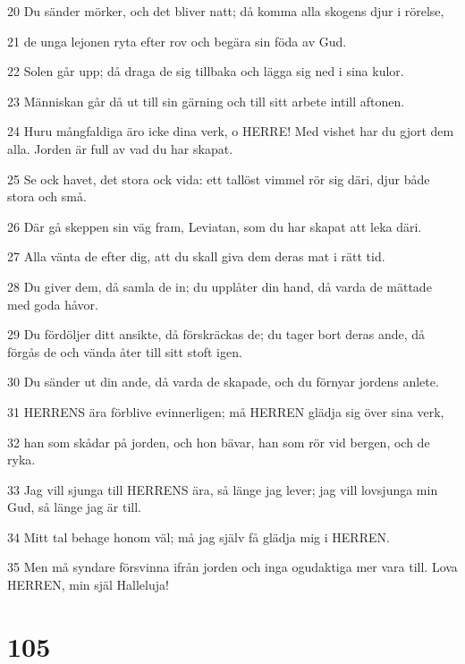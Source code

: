 \par 20 Du sänder mörker, och det bliver natt; då komma alla skogens djur i rörelse,
\par 21 de unga lejonen ryta efter rov och begära sin föda av Gud.
\par 22 Solen går upp; då draga de sig tillbaka och lägga sig ned i sina kulor.
\par 23 Människan går då ut till sin gärning och till sitt arbete intill aftonen.
\par 24 Huru mångfaldiga äro icke dina verk, o HERRE! Med vishet har du gjort dem alla. Jorden är full av vad du har skapat.
\par 25 Se ock havet, det stora ock vida: ett tallöst vimmel rör sig däri, djur både stora och små.
\par 26 Där gå skeppen sin väg fram, Leviatan, som du har skapat att leka däri.
\par 27 Alla vänta de efter dig, att du skall giva dem deras mat i rätt tid.
\par 28 Du giver dem, då samla de in; du upplåter din hand, då varda de mättade med goda håvor.
\par 29 Du fördöljer ditt ansikte, då förskräckas de; du tager bort deras ande, då förgås de och vända åter till sitt stoft igen.
\par 30 Du sänder ut din ande, då varda de skapade, och du förnyar jordens anlete.
\par 31 HERRENS ära förblive evinnerligen; må HERREN glädja sig över sina verk,
\par 32 han som skådar på jorden, och hon bävar, han som rör vid bergen, och de ryka.
\par 33 Jag vill sjunga till HERRENS ära, så länge jag lever; jag vill lovsjunga min Gud, så länge jag är till.
\par 34 Mitt tal behage honom väl; må jag själv få glädja mig i HERREN.
\par 35 Men må syndare försvinna ifrån jorden och inga ogudaktiga mer vara till. Lova HERREN, min själ Halleluja!

\chapter{105}

